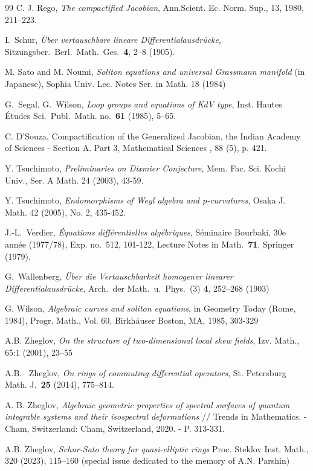 \documentclass[11pt]{article}
\theoremstyle{definition}
\theoremstyle{plain}
\numberwithin{equation}{section}
\begin{document}
\begin{thebibliography}{99}
 C. J. Rego, {\em The compactified Jacobian}, Ann.Scient. Ec. Norm. Sup., 13, 1980, 211--223. 

 I.~Schur, \emph{\"Uber vertauschbare lineare Differentialausdr\"ucke},
Sitzungsber.~Berl.~Math.~Ges.~\textbf{4}, 2--8 (1905).

 M. Sato and M. Noumi, {\em Soliton equations and universal Grassmann manifold} (in Japanese), Sophia Univ. Lec. Notes Ser. in Math. 18 (1984)

 G.~Segal, G.~Wilson, \emph{Loop groups and equations of KdV type},  Inst. Hautes \'Etudes Sci.~Publ.~Math. no.~\textbf{61} (1985), 5--65.

  C. D'Souza, Compactification of the Generalized Jacobian, the Indian Academy of Sciences - Section A. Part 3, Mathematical Sciences , 88 (5), p. 421.

 Y. Tsuchimoto, {\it Preliminaries on Dixmier Conjecture}, Mem. Fac. Sci. Kochi Univ., Ser. A
Math. 24 (2003), 43-59.

 Y. Tsuchimoto, {\it Endomorphisms of Weyl algebra and p-curvatures}, Osaka J. Math. 42 (2005), No. 2, 435-452.


 J.-L.~Verdier, \emph{\'Equations diff\'erentielles alg\'ebriques}, S\'eminaire Bourbaki, 30e ann\'ee (1977/78), Exp. no.~512, 101-122, Lecture Notes in Math.~\textbf{71}, Springer (1979).

 G.~Wallenberg, \textit{\"Uber die Vertauschbarkeit homogener linearer Differen\-ti\-al\-ausdr\"ucke},
Arch.~der Math.~u.~Phys.~(3) \textbf{4}, 252--268 (1903)

 G. Wilson, {\it Algebraic curves and soliton equations}, in Geometry Today (Rome, 1984), Progr. Math., Vol. 60, Birkh\'auser Boston, MA, 1985, 303-329

 A.B. Zheglov, {\it On the structure of two-dimensional local skew fields}, Izv. Math., 65:1 (2001), 23–55

A.B. ~Zheglov, \textit{On rings of commuting differential operators},
St. Petersburg Math. J.~\textbf{25} (2014),  775--814.

 A. B. Zheglov, {\it  Algebraic geometric properties of spectral surfaces of quantum integrable systems and their isospectral deformations} // Trends in Mathematics. - Cham, Switzerland: Cham, Switzerland, 2020. - P. 313-331.

 A.B. Zheglov, {\it Schur-Sato theory for quasi-elliptic rings} Proc. Steklov Inst. Math., 320 (2023), 115–160 (special issue dedicated to the memory of A.N. Parshin)


\end{thebibliography}
\end{document}
